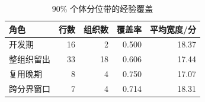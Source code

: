 \begin{table}[htbp]\centering\small
\caption{$90\%$ 个体分位带的经验覆盖}\label{tab:q4-v39-coverage}
\begin{tabular}{lrrrr}\toprule 角色 & 行数 & 组织数 & 覆盖率 & 平均宽度/分\\\midrule
开发期 & 16 & 2 & 0.500 & 18.37 \\
整组织留出 & 33 & 18 & 0.606 & 17.44 \\
复用晚期 & 8 & 4 & 0.750 & 17.07 \\
跨分界窗口 & 7 & 4 & 0.714 & 18.31 \\
\bottomrule\end{tabular}\end{table}
